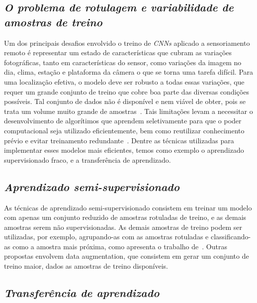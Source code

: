 
\subsection{\textit{O problema de rotulagem e variabilidade de amostras de treino}}\label{sec:Cap2_rotulagem}

Um dos principais desafios envolvido o treino de \textit{CNNs} aplicado a sensoriamento remoto é representar um estado de características que cubram as variações fotográficas, tanto em características do sensor, como variações da imagem no dia, clima, estação e plataforma da câmera o que se torna uma tarefa difícil. Para uma localização efetiva, o modelo deve ser robusto a todas essas variações, que requer um grande conjunto de treino que cobre boa parte das diversas condições possíveis. Tal conjunto de dados não é disponível e nem viável de obter, pois se trata um volume muito grande de amostras~\cite{rs13194017}. Tais limitações levam a necessitar o desenvolvimento de algorítimos que aprendem seletivamente para que o poder computacional seja utilizado eficientemente, bem como reutilizar conhecimento prévio e evitar treinamento redundante~\cite{rostami2019learning}.  Dentre as técnicas utilizadas para implementar esses modelos mais eficientes, temos como exemplo o aprendizado supervisionado fraco, e a transferência de aprendizado.

\subsection{\textit{Aprendizado semi-supervisionado}}\label{sec:Cap2_semisup}

As técnicas de aprendizado semi-supervisionado consistem em treinar um modelo com apenas um conjunto reduzido de amostras rotuladas de treino, e as demais amostras serem não supervisionadas. As demais amostras de treino podem ser utilizadas, por exemplo, agrupando-as com as amostras rotuladas e classificando-as como a amostra mais próxima, como apresenta o trabalho de~\cite{Sanches2003}. Outras propostas envolvem data augmentation, que consistem em gerar um conjunto de treino maior, dados as amostras de treino disponíveis.

\subsection{\textit{Transferência de aprendizado}}\label{sec:Cap2_transfer}


